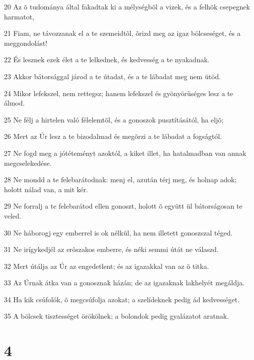 \par 20 Az õ tudománya által fakadtak ki a mélységbõl a vizek, és a felhõk csepegnek harmatot,
\par 21 Fiam, ne távozzanak el a te szemeidtõl, õrizd meg az igaz bölcseséget, és a meggondolást!
\par 22 És lesznek ezek élet a te lelkednek, és kedvesség a te nyakadnak.
\par 23 Akkor bátorsággal járod a te útadat, és a te lábadat meg nem ütöd.
\par 24 Mikor lefekszel, nem rettegsz; hanem lefekszel és gyönyörûséges lesz a te álmod.
\par 25 Ne félj a hirtelen való félelemtõl, és a gonoszok pusztításától, ha eljõ;
\par 26 Mert az Úr lesz a te bizodalmad és megõrzi a te lábadat a fogságtól.
\par 27 Ne fogd meg a jótéteményt azoktól, a kiket illet, ha hatalmadban van annak megcselekedése.
\par 28 Ne mondd a te felebarátodnak: menj el, azután térj meg, és holnap adok; holott nálad van, a mit kér.
\par 29 Ne forralj a te felebarátod ellen gonoszt, holott õ együtt ül bátorságosan te veled.
\par 30 Ne háborogj egy emberrel is ok nélkül, ha nem illetett gonoszszal téged.
\par 31 Ne irígykedjél az erõszakos emberre, és néki semmi útát ne válaszd.
\par 32 Mert útálja az Úr az engedetlent; és az igazakkal van az õ titka.
\par 33 Az Úrnak átka van a gonosznak házán; de az igazaknak lakhelyét megáldja.
\par 34 Ha kik csúfolók, õ megcsúfolja azokat; a szelídeknek pedig ád kedvességet.
\par 35 A bölcsek tisztességet örökölnek; a bolondok pedig gyalázatot aratnak.

\chapter{4}

